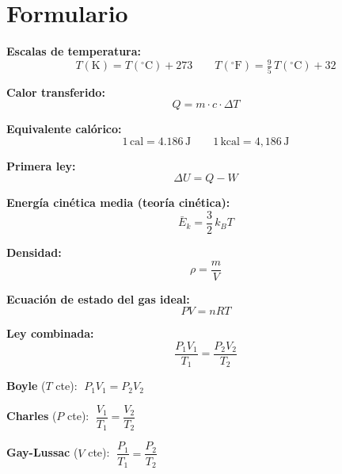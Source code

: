 \section*{Formulario}

\begin{nota}
\textbf{Escalas de temperatura:}
$$T(\text{K}) = T(^\circ\text{C}) + 273 \qquad T(^\circ\text{F}) = \tfrac{9}{5}\,T(^\circ\text{C}) + 32$$

\vspace{0.3cm}

\textbf{Calor transferido:}
$$Q = m \cdot c \cdot \Delta T$$

\vspace{0.3cm}

\textbf{Equivalente calórico:}
$$1\,\text{cal} = 4.186\,\text{J} \qquad 1\,\text{kcal} = 4{,}186\,\text{J}$$

\vspace{0.3cm}

\textbf{Primera ley:}
$$\Delta U = Q - W$$

\vspace{0.3cm}

\textbf{Energía cinética media (teoría cinética):}
$$\bar{E}_k = \frac{3}{2}\,k_B T$$

\vspace{0.3cm}

\textbf{Densidad:}
$$\rho = \frac{m}{V}$$

\vspace{0.3cm}

\textbf{Ecuación de estado del gas ideal:}
$$PV = nRT$$

\vspace{0.3cm}

\textbf{Ley combinada:}
$$\frac{P_1 V_1}{T_1} = \frac{P_2 V_2}{T_2}$$

\vspace{0.3cm}

\textbf{Boyle} ($T$ cte): $\;P_1 V_1 = P_2 V_2$

\vspace{0.3cm}

\textbf{Charles} ($P$ cte): $\;\dfrac{V_1}{T_1} = \dfrac{V_2}{T_2}$

\vspace{0.3cm}

\textbf{Gay-Lussac} ($V$ cte): $\;\dfrac{P_1}{T_1} = \dfrac{P_2}{T_2}$
\end{nota}
